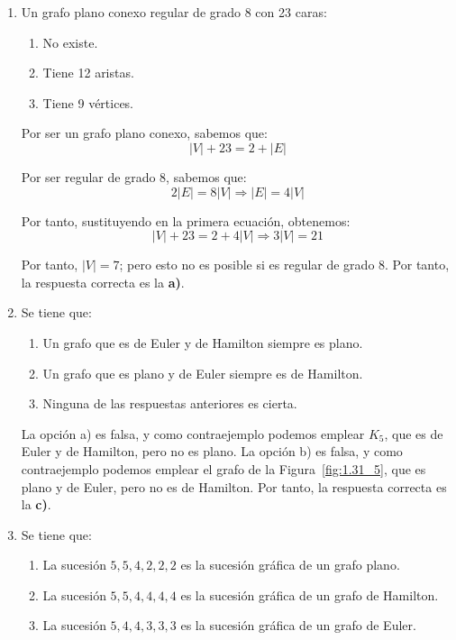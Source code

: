 \begin{ejercicio}
\begin{enumerate}
        \item Un grafo plano conexo regular de grado 8 con 23 caras:
        \begin{enumerate}
            \item No existe.
            \item Tiene 12 aristas.
            \item Tiene 9 vértices.
        \end{enumerate}

        Por ser un grafo plano conexo, sabemos que:
        \begin{equation*}
            |V|+23=2+|E|
        \end{equation*}

        Por ser regular de grado $8$, sabemos que:
        \begin{equation*}
            2|E|=8|V|\Longrightarrow |E|=4|V|
        \end{equation*}

        Por tanto, sustituyendo en la primera ecuación, obtenemos:
        \begin{equation*}
            |V|+23=2+4|V|\Longrightarrow 3|V|=21
        \end{equation*}


        Por tanto, $|V|=7$; pero esto no es posible si es regular de grado 8. Por tanto, la respuesta correcta es la \textbf{a)}.
        \item Se tiene que:
        \begin{enumerate}
            \item Un grafo que es de Euler y de Hamilton siempre es plano.
            \item Un grafo que es plano y de Euler siempre es de Hamilton.
            \item Ninguna de las respuestas anteriores es cierta.
        \end{enumerate}

        La opción a) es falsa, y como contraejemplo podemos emplear $K_5$, que es de Euler y de Hamilton, pero no es plano.
        La opción b) es falsa, y como contraejemplo podemos emplear el grafo de la Figura~\ref{fig:1.31_5}, que es plano y de Euler, pero no es de Hamilton.
        Por tanto, la respuesta correcta es la \textbf{c)}.
        \item \label{ej:1.36_4}
        Se tiene que:
        \begin{enumerate}
            \item La sucesión $5, 5, 4, 2, 2, 2$ es la sucesión gráfica de un grafo plano.
            \item La sucesión $5, 5, 4, 4, 4, 4$ es la sucesión gráfica de un grafo de Hamilton.
            \item La sucesión $5, 4, 4, 3, 3, 3$ es la sucesión gráfica de un grafo de Euler.
        \end{enumerate}


\end{enumerate}
\end{ejercicio}
